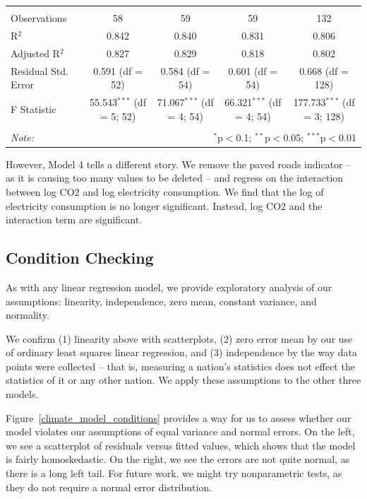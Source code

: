 \documentclass[11pt]{article}
\begin{document}
\begin{landscape}
\begin{table}[!htbp]
\begin{tabular}{@{\extracolsep{5pt}}lcccc}
  & & & & \\ 
\hline \\[-1.8ex] 
Observations & 58 & 59 & 59 & 132 \\ 
R$^{2}$ & 0.842 & 0.840 & 0.831 & 0.806 \\ 
Adjusted R$^{2}$ & 0.827 & 0.829 & 0.818 & 0.802 \\ 
Residual Std. Error & 0.591 (df = 52) & 0.584 (df = 54) & 0.601 (df = 54) & 0.668 (df = 128) \\ 
F Statistic & 55.543$^{***}$ (df = 5; 52) & 71.067$^{***}$ (df = 4; 54) & 66.321$^{***}$ (df = 4; 54) & 177.733$^{***}$ (df = 3; 128) \\ 
\hline 
\hline \\[-1.8ex] 
\textit{Note:}  & \multicolumn{4}{r}{$^{*}$p$<$0.1; $^{**}$p$<$0.05; $^{***}$p$<$0.01} \\ 
\end{tabular} 
\end{table} 
\end{landscape}
\restoregeometry
\doublespacing

However, Model 4 tells a different story.
We remove the paved roads indicator -- as it is causing too many values to be deleted -- and regress on the interaction between log CO2 and log electricity consumption.
We find that the log of electricity consumption is no longer significant.
Instead, log CO2 and the interaction term are significant.

\subsection{Condition Checking}
As with any linear regression model, we provide exploratory analysis of our assumptions: linearity, independence, zero mean, constant variance, and normality.

We confirm (1) linearity above with scatterplots, (2) zero error mean by our use of ordinary least squares linear regression, and (3) independence by the way data points were collected -- that is, measuring a nation's statistics does not effect the statistics of it or any other nation. We apply these assumptions to the other three models.

Figure~\ref{climate_model_conditions} provides a way for us to assess whether our model violates our assumptions of equal variance and normal errors. On the left, we see a scatterplot of residuals versus fitted values, which shows that the model is fairly homoskedastic. On the right, we see the errors are not quite normal, as there is a long left tail. For future work, we might try nonparametric tests, as they do not require a normal error distribution.
\end{document}
